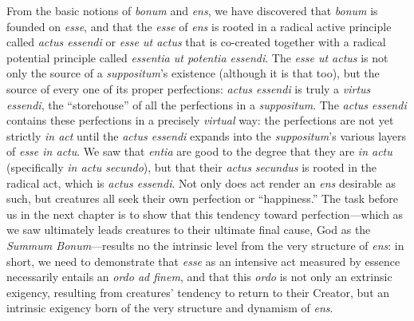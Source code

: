 From the basic notions of \emph{bonum} and \emph{ens}, we have discovered that \emph{bonum} is founded on \emph{esse}, and that the \emph{esse} of \emph{ens} is rooted in a radical active principle called \emph{actus essendi} or \emph{esse ut actus} that is co-created together with a radical potential principle called \emph{essentia ut potentia essendi}. The \emph{esse ut actus} is not only the source of a \emph{suppositum}’s existence (although it is that too), but the source of every one of its proper perfections: \emph{actus essendi} is truly a \emph{virtus essendi}, the “storehouse” of all the perfections in a \emph{suppositum}. The \emph{actus essendi} contains these perfections in a precisely \emph{virtual} way: the perfections are not yet strictly \emph{in act} until the \emph{actus essendi} expands into the \emph{suppositum}’s various layers of \emph{esse in actu}. We saw that \emph{entia} are good to the degree that they are \emph{in actu} (specifically \emph{in actu secundo}), but that their \emph{actus secundus} is rooted in the radical act, which is \emph{actus essendi}. Not only does act render an \emph{ens} desirable as such, but creatures all seek their own perfection or “happiness.” The task before us in the next chapter is to show that this tendency toward perfection—which as we saw ultimately leads creatures to their ultimate final cause, God as the \emph{Summum Bonum}—results no the intrinsic level from the very structure of \emph{ens}: in short, we need to demonstrate that \emph{esse} as an intensive act measured by essence necessarily entails an \emph{ordo ad finem}, and that this \emph{ordo} is not only an extrinsic exigency, resulting from creatures’ tendency to return to their Creator, but an intrinsic exigency born of the very structure and dynamism of \emph{ens}.